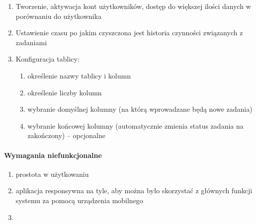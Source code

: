 \begin{enumerate} 
	\item Tworzenie, aktywacja kont użytkowników, dostęp do większej ilości danych w porównaniu do użytkownika
	\item Ustawienie czasu po jakim czyszczona jest historia czynności związanych z zadaniami
	\item Konfiguracja tablicy:
	\begin{enumerate}[leftmargin=3em]
		\item określenie nazwy tablicy i kolumn
		\item określenie liczby kolumn
		\item wybranie domyślnej kolumny (na którą wprowadzane będą nowe zadania)
		\item wybranie końcowej kolumny (automatycznie zmienia status zadania na zakończony) –  opcjonalne
	\end{enumerate}
	
\end{enumerate}

\paragraph{Wymagania niefunkcjonalne}
\begin{enumerate}
	\item prostota w użytkowaniu
	\item aplikacja responsywna na tyle, aby można było skorzystać z głównych funkcji systemu za pomocą urządzenia mobilnego
	\item 
\end{enumerate}

\clearpage

